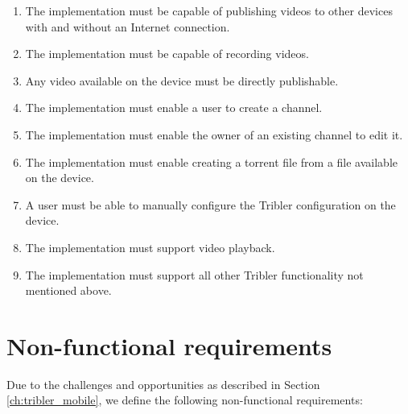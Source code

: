 \begin{enumerate}[label=A\arabic*.]
	
	\item The implementation must be capable of publishing videos to other devices with and without an Internet connection.
	\item The implementation must be capable of recording videos.
	\item Any video available on the device must be directly publishable. %
	\item The implementation must enable a user to create a channel.
	\item The implementation must enable the owner of an existing channel to edit it.
	\item The implementation must enable creating a torrent file from a file available on the device.
	\item A user must be able to manually configure the Tribler configuration on the device.
	\item The implementation must support video playback.
	\item The implementation must support all other Tribler functionality not mentioned above.
	
\end{enumerate}


\section{Non-functional requirements}

Due to the challenges and opportunities as described in Section \ref{ch:tribler_mobile}, we define the following non-functional requirements:

